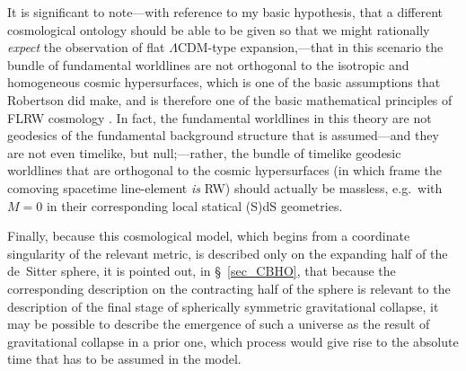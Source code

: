 It is significant to note---with reference to my basic hypothesis, that a different cosmological ontology should be able to be given so that we might rationally \textit{expect} the observation of flat $\Lambda$CDM-type expansion,---that in this scenario the bundle of fundamental worldlines are not orthogonal to the isotropic and homogeneous cosmic hypersurfaces, which is one of the basic assumptions that Robertson did make, and is therefore one of the basic mathematical principles of FLRW cosmology \cite{Rugh2010}. In fact, the fundamental worldlines in this theory are not geodesics of the fundamental background structure that is assumed---and they are not even timelike, but null;---rather, the bundle of timelike geodesic worldlines that are orthogonal to the cosmic hypersurfaces (in which frame the comoving spacetime line-element \textit{is} RW) should actually be massless, e.g.~with $M=0$ in their corresponding local statical (S)dS geometries.

Finally, because this cosmological model, which begins from a coordinate singularity of the relevant metric, is described only on the expanding half of the de~Sitter sphere, it is pointed out, in \S~\ref{sec_CBHO}, that because the corresponding description on the contracting half of the sphere is relevant to the description of the final stage of spherically symmetric gravitational collapse, it may be possible to describe the emergence of such a universe as the result of gravitational collapse in a prior one, which process would give rise to the absolute time that has to be assumed in the model.